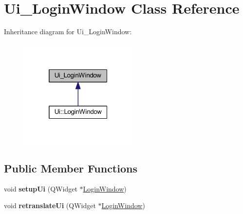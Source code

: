 \hypertarget{class_ui___login_window}{}\section{Ui\+\_\+\+Login\+Window Class Reference}
\label{class_ui___login_window}


Inheritance diagram for Ui\+\_\+\+Login\+Window\+:\nopagebreak
\begin{figure}[H]
\begin{center}
\leavevmode
\includegraphics[width=169pt]{class_ui___login_window__inherit__graph}
\end{center}
\end{figure}
\subsection*{Public Member Functions}
\begin{DoxyCompactItemize}
\item 
\mbox{\label{class_ui___login_window_a1c3ffc6b9784b68654c59db923f3c217}} 
void {\bfseries setup\+Ui} (Q\+Widget $\ast$\mbox{\hyperlink{class_login_window}{Login\+Window}})
\item 
\mbox{\label{class_ui___login_window_a5f6832fbf9554aef841da1efc1b0fa84}} 
void {\bfseries retranslate\+Ui} (Q\+Widget $\ast$\mbox{\hyperlink{class_login_window}{Login\+Window}})
\end{DoxyCompactItemize}
